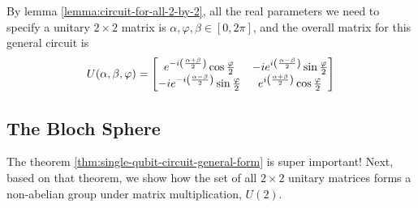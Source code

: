 \documentclass[12pt]{article}
\begin{document}
\begin{theorem}\label{thm:single-qubit-circuit-general-form}
By lemma \ref{lemma:circuit-for-all-2-by-2}, all the real parameters we need to specify a unitary $2\times 2$ matrix is $\alpha, \varphi, \beta\in [0,2\pi]$, and the overall matrix for this general circuit is $$
U(\alpha, \beta, \varphi) = \begin{bmatrix}
e^{-i\left(\frac{\alpha + \beta}{2}\right)}\cos\frac{\varphi}{2} & -ie^{i\left(\frac{\alpha - \beta}{2}\right)}\sin\frac{\varphi}{2}\\
-ie^{-i\left(\frac{\alpha - \beta}{2}\right)}\sin\frac{\varphi}{2} & e^{i\left(\frac{\alpha + \beta}{2}\right)}\cos\frac{\varphi}{2}
\end{bmatrix}
$$
\end{theorem}

\subsection{The Bloch Sphere}
The theorem \ref{thm:single-qubit-circuit-general-form} is super important! Next, based on that theorem, we show how the set of all $2\times 2$ unitary matrices forms a non-abelian group under matrix multiplication, $U(2)$.
\end{document}
